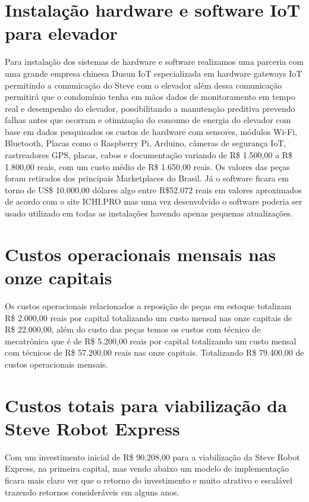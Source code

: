 \section{Instalação hardware e software IoT para elevador}
Para instalação dos sistemas de hardware e software realizamos uma parceria com uma grande empresa chinesa Dusun IoT \cite{DusunIot} especializada em hardware gateways IoT permitindo a comunicação do Steve com o elevador além dessa comunicação permitirá que o condomínio tenha em mãos dados de monitoramento em tempo real e desempenho do elevador, possibilitando a manutenção preditiva prevendo falhas antes que ocorram e otimização do consumo de energia do elevador com base em dados pesquisados os custos de hardware com sensores, módulos Wi-Fi, Bluetooth, Placas como o Raspberry Pi, Arduino, câmeras de segurança IoT, rastreadores GPS, placas, cabos e documentação variando de R\$ 1.500,00 a R\$ 1.800,00 reais, com um custo médio de R\$ 1.650,00 reais. Os valores das peças foram retirados dos principais Marketplaces do Brasil. Já o software ficara em torno de US\$ 10.000,00 dólares algo entre R\$52.072 reais em valores aproximados de acordo com o site ICHI.PRO \cite{ICHI.PRO} mas uma vez desenvolvido o software poderia ser usado utilizado em todas as instalações havendo apenas pequenas atualizações. 

\section{Custos operacionais mensais nas onze capitais}
Os custos operacionais relacionados a reposição de peças em estoque totalizam R\$ 2.000,00 reais por capital totalizando um custo mensal nas onze capitais de R\$ 22.000,00, além do custo das peças temos os custos com técnico de mecatrônica que é de R\$ 5.200,00 reais por capital totalizando um custo mensal com técnicos de R\$ 57.200,00 reais nas onze capitais. Totalizando R\$ 79.400,00 de custos operacionais mensais.

\section{Custos totais para viabilização da Steve Robot Express}
Com um investimento inicial de R\$ 90.208,00 para a viabilização da Steve Robot Express, na primeira capital, mas vendo abaixo um modelo de implementação ficara mais claro ver que o retorno do investimento e muito atrativo e escalável trazendo retornos consideráveis em alguns anos.

